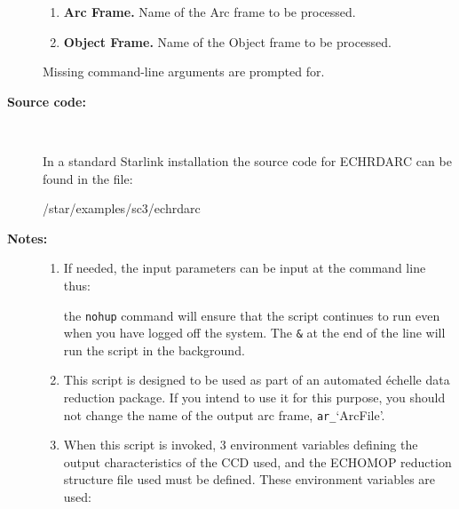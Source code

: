 \documentclass[twoside,11pt]{starlink}
\begin{document}
\begin{description}
\begin{enumerate}

\item \textbf{Arc Frame.}
      Name of the Arc frame to be processed.

\item \textbf{Object Frame.}
      Name of the Object frame to be processed.

\end{enumerate}

     Missing command-line arguments are prompted for.

\item [\textbf{Source code:}] \mbox{} \\
\begin{latexonly}
In a standard Starlink installation the source code for ECHRDARC can be found
in the file:
\begin{terminalv}
   /star/examples/sc3/echrdarc
\end{terminalv}
\end{latexonly}



\item [\textbf{Notes:}] \mbox{}
\begin{enumerate}

\item If needed, the input parameters can be input at the command
      line thus:

\begin{terminalv}
\end{terminalv}

      the \verb+nohup+ command will ensure that the script continues
      to run even when you have logged off the system.  The \verb+&+ at
      the end of the line will run the script in the background.

\item This script is designed to be used as part of an automated
      \'{e}chelle data reduction package.  If you intend to use it
      for this purpose, you should not change the name of the output
      arc frame, \verb+ar_+`ArcFile'.

\item When this script is invoked, 3 environment variables defining
      the output characteristics of the CCD used, and the ECHOMOP
      reduction structure file used must be defined.
      These environment variables are used:

\begin{description}


\end{description}
\end{enumerate}
\end{description}
\end{document}
